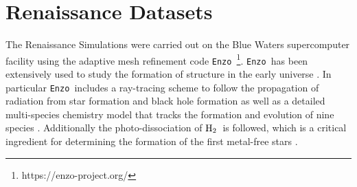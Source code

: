 \documentclass[graphics, twocolumn, usenatbib]{mn2e}
\newcommand{\enzo}{\texttt{Enzo~}}
\newcommand{\molH} {$\rm{H_2}$~}
\begin{document}
\section{Renaissance Datasets} \label{Sec:RenaissanceDatasets}
The Renaissance Simulations were carried out on the Blue Waters supercomputer facility using the
adaptive mesh refinement code \enzo\citep{Enzo_2014, Enzo_2019}\footnote{https://enzo-project.org/}.
\enzo has been extensively used to study the formation of structure in the early universe
\citep{Abel_2002, OShea_2005b, Turk_2012, Wise_2012b, Wise_2014, Regan_2015, Regan_2017}. In
particular \enzo includes a ray-tracing scheme to follow the propagation of radiation from star
formation and
black hole formation \citep{WiseAbel_2011} as well as a detailed multi-species chemistry model that
tracks the formation and evolution of nine species \citep{Anninos_1997, Abel_1997, Grackle}. Additionally the photo-dissociation of \molH is followed, which is a critical ingredient for
determining the formation of the first metal-free stars \citep{Abel_2000}. 
\end{document}

